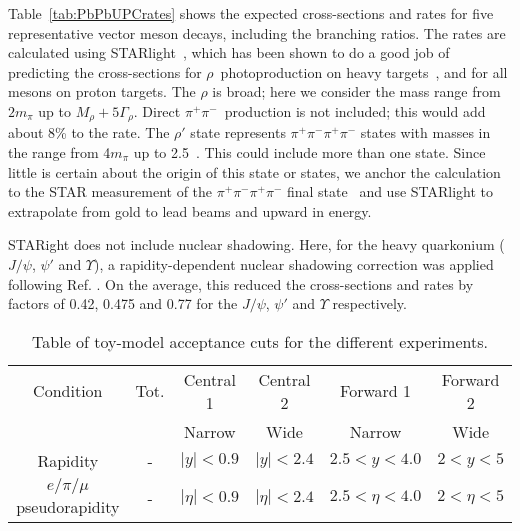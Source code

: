 \documentclass[../report.tex]{subfiles}
\begin{document}
Table~\ref{tab:PbPbUPCrates} shows the expected cross-sections and rates for five representative vector meson decays, including the branching ratios.  The rates are calculated using STARlight~\cite{Klein:2016yzr}, which has been shown to do a good job of predicting the cross-sections for $\rho$~photoproduction on heavy targets~\cite{Adam:2015gsa,Abelev:2007nb}, and for all mesons on proton targets.  The $\rho$ is broad; here we consider the mass range from $2m_\pi$ up to $M_\rho + 5\Gamma_\rho$.  Direct $\pi^+\pi^-$~production is not included; this would add about 8\% to the rate.  
The $\rho'$ state represents $\pi^+\pi^-\pi^+\pi^-$ states with masses in the range from 4$m_\pi$ up to 2.5~\UGeVcc.  This could include more than one state.  Since little is certain about the origin of this state or states, we anchor the calculation to the STAR measurement of the $\pi^+\pi^-\pi^+\pi^-$ final state~\cite{Abelev:2009aa} and use STARlight to extrapolate from gold to lead beams and upward in energy. 

STARight does not include nuclear shadowing.  Here, for the heavy quarkonium ($J/\psi$, $\psi'$ and $\Upsilon$), a rapidity-dependent nuclear shadowing correction was applied following Ref. \cite{Guzey:2016piu}.  On the average, this reduced the cross-sections and rates  by factors of 0.42, 0.475 and 0.77 for the $J/\psi$, $\psi'$ and $\Upsilon$ respectively.  

\begin{table}[h]
\begin{tabular}{|c|ccccc|}
\hline
Condition & Tot. & Central 1 & Central 2 & Forward 1 &  Forward 2   \\
                 &       & Narrow  & Wide    &      Narrow     &    Wide         \\
\hline
Rapidity & - & $|y|<0.9$ & $|y|<2.4$ & $2.5 < y < 4.0$ &   $2 < y < 5$ \\
$e/\pi/\mu$ pseudorapidity & - & $|\eta|<0.9$ & $|\eta|<2.4$  & $2.5 < \eta < 4.0$ & $2 < \eta <5 $ \\
\hline
\end{tabular}
\caption{Table of toy-model acceptance cuts for the different experiments.}
\label{tab:UPCtoyacceptance}
\end{table}
\end{document}
